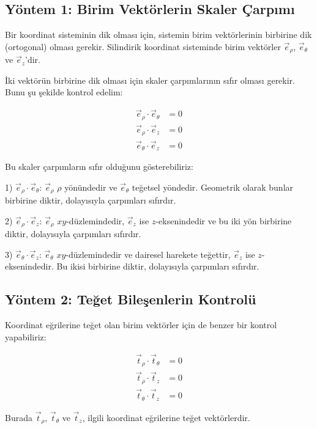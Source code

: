 \documentclass[11pt,letterpaper,twocolumn]{fenbil}
\begin{document}
\subsection*{Yöntem 1: Birim Vektörlerin Skaler Çarpımı}

Bir koordinat sisteminin dik olması için, sistemin birim vektörlerinin birbirine dik (ortogonal) olması gerekir. Silindirik koordinat sisteminde birim vektörler $\vec{e}_\rho$, $\vec{e}_\theta$ ve $\vec{e}_z$'dir.

İki vektörün birbirine dik olması için skaler çarpımlarının sıfır olması gerekir. Bunu şu şekilde kontrol edelim:

\begin{align}
    \vec{e}_\rho \cdot \vec{e}_\theta &= 0 \\
    \vec{e}_\rho \cdot \vec{e}_z &= 0 \\
    \vec{e}_\theta \cdot \vec{e}_z &= 0
\end{align}

Bu skaler çarpımların sıfır olduğunu gösterebiliriz:

1) $\vec{e}_\rho \cdot \vec{e}_\theta$: $\vec{e}_\rho$ $\rho$ yönündedir ve $\vec{e}_\theta$ teğetsel yöndedir. Geometrik olarak bunlar birbirine diktir, dolayısıyla çarpımları sıfırdır.

2) $\vec{e}_\rho \cdot \vec{e}_z$: $\vec{e}_\rho$ $xy$-düzlemindedir, $\vec{e}_z$ ise $z$-eksenindedir ve bu iki yön birbirine diktir, dolayısıyla çarpımları sıfırdır.

3) $\vec{e}_\theta \cdot \vec{e}_z$: $\vec{e}_\theta$ $xy$-düzlemindedir ve dairesel harekete teğettir, $\vec{e}_z$ ise $z$-eksenindedir. Bu ikisi birbirine diktir, dolayısıyla çarpımları sıfırdır.

\subsection*{Yöntem 2: Teğet Bileşenlerin Kontrolü}

Koordinat eğrilerine teğet olan birim vektörler için de benzer bir kontrol yapabiliriz:

\begin{align}
    \vec{t}_\rho \cdot \vec{t}_\theta &= 0 \\
    \vec{t}_\rho \cdot \vec{t}_z &= 0 \\
    \vec{t}_\theta \cdot \vec{t}_z &= 0
\end{align}

Burada $\vec{t}_\rho$, $\vec{t}_\theta$ ve $\vec{t}_z$, ilgili koordinat eğrilerine teğet vektörlerdir.
\end{document}
